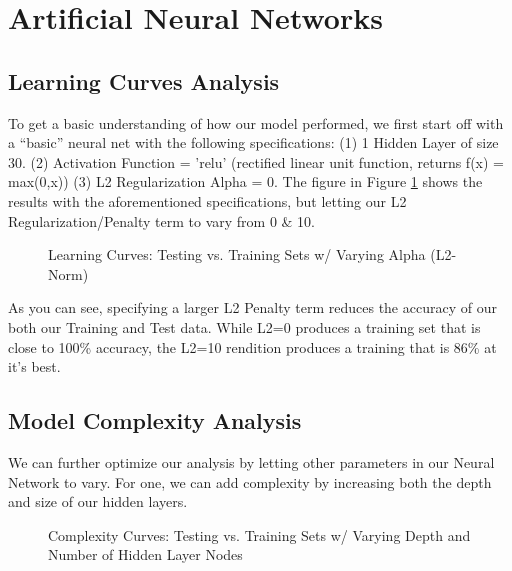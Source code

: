 \documentclass[letterpaper,12pt]{article}
\begin{document}
\section{Artificial Neural Networks}

\subsection{Learning Curves Analysis}
To get a basic understanding of how our model performed, we first start off with a ``basic'' neural net with the following specifications:  (1) 1 Hidden Layer of size 30.  (2) Activation Function = 'relu' (rectified linear unit function, returns f(x) = max(0,x)) (3) L2 Regularization Alpha = 0.  The figure in Figure \ref{fig:ANN Learning Curves} shows the results with the aforementioned specifications, but letting our L2 Regularization/Penalty term to vary from 0 \& 10.


\begin{figure} %
  \centering
  \hspace{8pt}%
  \caption{Learning Curves:  Testing vs. Training Sets w/ Varying Alpha (L2-Norm)}\label{fig:ANN Learning Curves}
\end{figure}

As you can see, specifying a larger L2 Penalty term reduces the accuracy of our both our Training and Test data.  While L2=0 produces a training set that is close to 100\% accuracy, the L2=10 rendition produces a training that is 86\% at it's best.

\subsection{Model Complexity Analysis}
We can further optimize our analysis by letting other parameters in our Neural Network to vary.  For one, we can add complexity by increasing both the depth and size of our hidden layers.

\begin{figure} %
  \centering
  \hspace{8pt}%
  \caption{Complexity Curves:  Testing vs. Training Sets w/ Varying Depth and Number of Hidden Layer Nodes}\label{fig:ANN Complexity Curves}
\end{figure}
\end{document}
